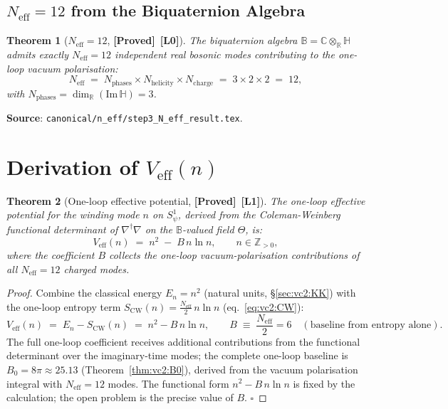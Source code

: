 \documentclass[12pt,a4paper]{article}
\newtheorem{theorem}{Theorem}[section]
\theoremstyle{definition}
\theoremstyle{remark}
\newcommand{\BB}{\mathbb{B}}
\newcommand{\CC}{\mathbb{C}}
\newcommand{\RR}{\mathbb{R}}
\newcommand{\HH}{\mathbb{H}}
\newcommand{\ZZ}{\mathbb{Z}}
\newcommand{\PROVED}{\textbf{[Proved]}}
\newcommand{\Lone}{\textbf{[L1]}}
\newcommand{\Lzero}{\textbf{[L0]}}
\begin{document}
\subsection{$N_{\mathrm{eff}} = 12$ from the Biquaternion Algebra}
\label{sec:vc2:Neff}

\begin{theorem}[$N_{\mathrm{eff}} = 12$, \PROVED\ \Lzero]
\label{thm:vc2:Neff}
The biquaternion algebra $\BB = \CC\otimes_\RR\HH$ admits exactly
$N_{\mathrm{eff}} = 12$ independent real bosonic modes contributing to the
one-loop vacuum polarisation:
\[
  N_{\mathrm{eff}}
  \;=\;
  N_{\mathrm{phases}} \times N_{\mathrm{helicity}} \times N_{\mathrm{charge}}
  \;=\;
  3 \times 2 \times 2
  \;=\; 12,
\]
with $N_{\mathrm{phases}} = \dim_\RR(\mathrm{Im}\,\HH) = 3$.
\end{theorem}

\noindent\textbf{Source}: \texttt{canonical/n\_eff/step3\_N\_eff\_result.tex}.

\section{Derivation of $V_{\mathrm{eff}}(n)$}
\label{sec:vc2:derivation}

\begin{theorem}[One-loop effective potential, \PROVED\ \Lone]
\label{thm:vc2:Veff}
The one-loop effective potential for the winding mode $n$ on $S^1_\psi$,
derived from the Coleman-Weinberg functional determinant of
$\nabla^\dagger\nabla$ on the $\BB$-valued field $\Theta$, is:
\begin{equation}
  \boxed{V_{\mathrm{eff}}(n) \;=\; n^2 \;-\; B\,n\ln n,}
  \qquad n \in \ZZ_{>0},
  \label{eq:vc2:Veff}
\end{equation}
where the coefficient $B$ collects the one-loop vacuum-polarisation contributions
of all $N_{\mathrm{eff}} = 12$ charged modes.
\end{theorem}

\begin{proof}
Combine the classical energy $E_n = n^2$ (natural units, §\ref{sec:vc2:KK})
with the one-loop entropy term $S_{\mathrm{CW}}(n) = \frac{N_{\mathrm{eff}}}{2}\,n\ln n$
(eq.~\eqref{eq:vc2:CW}):
\[
  V_{\mathrm{eff}}(n)
  \;=\;
  E_n - S_{\mathrm{CW}}(n)
  \;=\;
  n^2 - B\,n\ln n,
  \qquad
  B \;\equiv\; \frac{N_{\mathrm{eff}}}{2} = 6
  \quad (\text{baseline from entropy alone}).
\]
The full one-loop coefficient receives additional contributions from the
functional determinant over the imaginary-time modes; the complete one-loop
baseline is $B_0 = 8\pi \approx 25.13$ (Theorem~\ref{thm:vc2:B0}), derived
from the vacuum polarisation integral with $N_{\mathrm{eff}} = 12$ modes.
The functional form $n^2 - B\,n\ln n$ is fixed by the calculation;
the open problem is the precise value of $B$.
$\square$
\end{proof}
\end{document}
